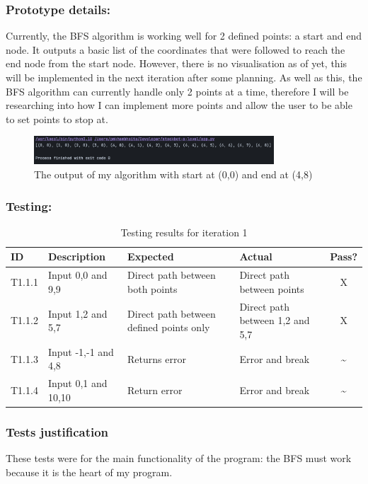 \subsubsection{Prototype details:} 
Currently, the BFS algorithm is working well for 2 defined points: a start and end node. It outputs a basic list of the coordinates that were followed to reach the end node from the start node. However, there is no visualisation as of yet, this will be implemented in the next iteration after some planning. As well as this, the BFS algorithm can currently handle only 2 points at a time, therefore I will be researching into how I can implement more points and allow the user to be able to set points to stop at.
\begin{figure}[htbp]
    \centering
    \includegraphics[width=0.8\textwidth]{Images/Screenshot 2025-03-30 at 11.18.52.png}
    \caption{The output of my algorithm with start at (0,0) and end at (4,8)}
\end{figure}

\subsubsection{Testing:}
\begin{table}[htbp]
\centering
\begin{tabularx}{\textwidth}{|l|X|p{3.5cm}|p{3.5cm}|c|}
\hline
\textbf{ID} & \textbf{Description} & \textbf{Expected} & \textbf{Actual} & \textbf{Pass?} \\
\hline
T1.1.1 & Input 0,0 and 9,9 & Direct path between both points & Direct path between points & X \\
\hline
T1.1.2 & Input 1,2 and 5,7 & Direct path between defined points only & Direct path between 1,2 and 5,7 & X \\
\hline
T1.1.3 & Input -1,-1 and 4,8 & Returns error & Error and break & \~{} \\
\hline
T1.1.4 & Input 0,1 and 10,10 & Return error & Error and break & \~{} \\
\hline

\end{tabularx}
\caption{Testing results for iteration 1}
\end{table}

\subsubsection{Tests justification}
These tests were for the main functionality of the program: the BFS must work because it is the heart of my program.
